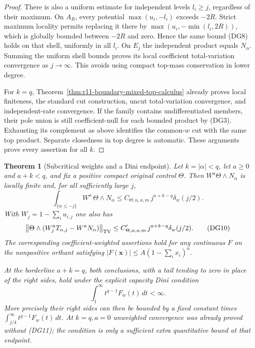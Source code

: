 \documentclass[11pt,a4paper]{article}
\numberwithin{equation}{section}
\newtheorem{theorem}{Theorem}[section]
\theoremstyle{definition}
\theoremstyle{remark}
\begin{document}
\begin{proof}
There is also a uniform estimate for independent levels
$l_i\geq j$, regardless of their maximum. On $A_R$, every
potential $\max(u_i,-l_i)$ exceeds $-2R$. Strict maximum
locality permits replacing it there by
$\max(u_i,-\min(l_i,2R))$, which is globally bounded between
$-2R$ and zero. Hence the same bound (DG8) holds on that shell,
uniformly in all $l_i$. On $E_j$ the independent product equals
$N_\alpha$. Summing the uniform shell bounds proves its
local coefficient total-variation convergence as $j\to\infty$.
This avoids using compact top-mass conservation in lower degree.

For $k=q$, Theorem~\ref{thm:r11-boundary-mixed-top-calculus}
already proves local finiteness, the standard cut construction,
uncut total-variation convergence, and independent-rate convergence.
If the family contains undifferentiated members, their pole union
is still coefficient-null for each bounded product by (DG3).
Exhausting its complement as above identifies the common-$w$
cut with the same top product. Separate closedness in top degree
is automatic. These arguments prove every assertion for all $k$.
\end{proof}

\begin{theorem}[Subcritical weights and a Dini endpoint]
\label{thm:r11-capacity-dimension-weighted}
Let $k=|\alpha|<q$, let $a\geq0$ and $a+k<q$, and fix a
positive compact original control $\Theta$.
Then $W^a\Theta\wedge N_\alpha$ is locally finite and, for all
sufficiently large $j$,
\[
 \int_{\{w\leq-j\}}W^a\,\Theta\wedge N_\alpha
       \leq C_{\Theta,\alpha,a,m}\,
               j^{a+k-q}\delta_w(j/2).
 \tag{DG9}
\]
With $W_j=1-\sum_i u_{i,j}$ one also has
\[
 \left\|\Theta\wedge
       (W_j^aT_{\alpha,j}-W^aN_\alpha)\right\|_{\rm TV}
       \leq C'_{\Theta,\alpha,a,m}\,
               j^{a+k-q}\delta_w(j/2).
 \tag{DG10}
\]
The corresponding coefficient-weighted assertions hold for any
continuous $F$ on the nonpositive orthant satisfying
$|F(\mathbf x)|\leq A(1-\sum_i x_i)^a$.

At the borderline $a+k=q$, both conclusions, with a tail tending
to zero in place of the right sides, hold under the explicit
capacity Dini condition
\[
                 \int_1^\infty t^{q-1}F_w(t)\,dt<\infty.
 \tag{DG11}
\]
More precisely their right sides can then be bounded by a fixed
constant times
$\int_{j/4}^\infty t^{q-1}F_w(t)\,dt$.
At $k=q,a=0$ unweighted convergence was already proved without
(DG11); the condition is only a sufficient extra quantitative
bound at that endpoint.
\end{theorem}
\end{document}
